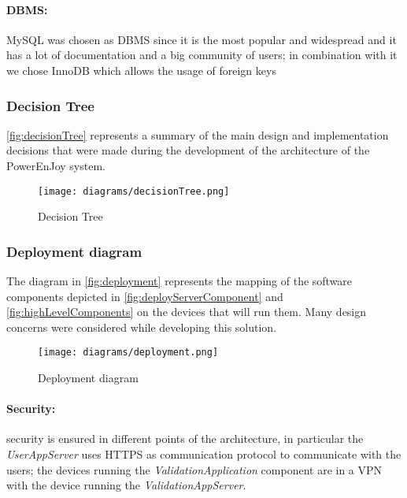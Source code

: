 \paragraph{DBMS:} MySQL was chosen as DBMS since it is the most popular and widespread and it has a lot of documentation and a big community of users; in combination with it we chose InnoDB which allows the usage of foreign keys
\clearpage
\subsubsection{Decision Tree}
\autoref{fig:decisionTree} represents a summary of the main design and implementation decisions that were made during the development of the architecture of the PowerEnJoy system.\\

\begin{figure}[h!]
	\centering
	\texttt{[image: diagrams/decisionTree.png]}
	\caption{
		\label{fig:decisionTree}  
		Decision Tree
	}
\end{figure}
\clearpage
\subsubsection{Deployment diagram} 

The diagram in \autoref{fig:deployment} represents the mapping of the software components depicted in \autoref{fig:deployServerComponent} and \autoref{fig:highLevelComponents} on the devices that will run them. Many design concerns were considered while developing this solution.\newline\newline\newline

\begin{figure}[ht!]
	\centering
	\texttt{[image: diagrams/deployment.png]}
	\caption{
		\label{fig:deployment} 
		Deployment diagram 
	}
\end{figure}

\clearpage

\paragraph{Security:}security is ensured in different points of the architecture, in particular the \emph{UserAppServer} uses HTTPS as communication protocol to communicate with the users; the devices running the \emph{ValidationApplication} component are in a VPN with the device running the \emph{ValidationAppServer}.

